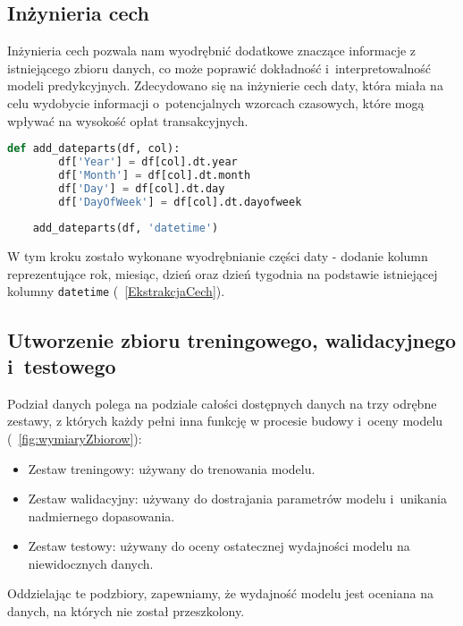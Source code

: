 \documentclass[12pt,a4paper]{report}
\theoremstyle{definition} %
\begin{document}
	\subsection{Inżynieria cech}
	\hspace*{\parindent}Inżynieria cech pozwala nam wyodrębnić dodatkowe znaczące informacje z istniejącego zbioru danych, co może poprawić dokładność i~interpretowalność modeli predykcyjnych. Zdecydowano się na inżynierie cech daty, która miała na celu wydobycie informacji o~potencjalnych wzorcach czasowych, które mogą wpływać na wysokość opłat transakcyjnych. 

	\begin{lstlisting}[language=Python,caption=Ekstrakcja cech daty w procesie inżynierii cech,label=EkstrakcjaCech]
	def add_dateparts(df, col):
	    df['Year'] = df[col].dt.year
	    df['Month'] = df[col].dt.month
	    df['Day'] = df[col].dt.day
	    df['DayOfWeek'] = df[col].dt.dayofweek
	
	add_dateparts(df, 'datetime')
	\end{lstlisting}
	
	W tym kroku zostało wykonane wyodrębnianie części daty - dodanie kolumn reprezentujące rok, miesiąc, dzień oraz dzień tygodnia na podstawie istniejącej kolumny \texttt{datetime} (\lstlistingname~\ref{EkstrakcjaCech}).

	\subsection{Utworzenie zbioru treningowego, walidacyjnego i~testowego}
	Podział danych polega na podziale całości dostępnych danych na trzy odrębne zestawy, z których każdy pełni inna funkcję w procesie budowy i~oceny modelu (\figurename~\ref{fig:wymiaryZbiorow}):
	\begin{itemize}
	    \item Zestaw treningowy: używany do trenowania modelu.
	    \item Zestaw walidacyjny: używany do dostrajania parametrów modelu i~unikania nadmiernego dopasowania.
	    \item Zestaw testowy: używany do oceny ostatecznej wydajności modelu na niewidocznych danych.
	\end{itemize}
	
	Oddzielając te podzbiory, zapewniamy, że wydajność modelu jest oceniana na danych, na których nie został przeszkolony.
\end{document}
